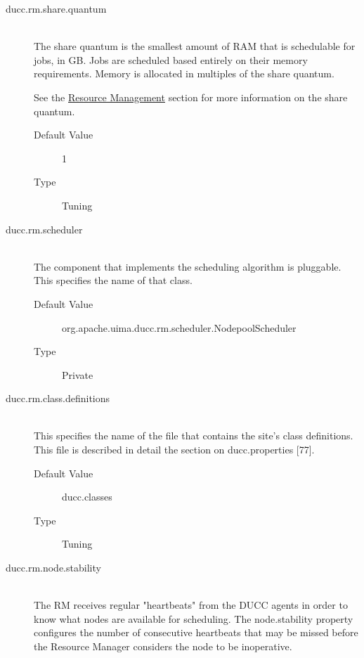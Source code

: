 \begin{description}
        \item[ducc.rm.share.quantum] \hfill \\
          The share quantum is the smallest amount of RAM that is schedulable for jobs, in GB. 
          Jobs are scheduled based entirely on their memory requirements. Memory is allocated in 
          multiples of the share quantum. 

          See the \hyperref[chap:rm]{Resource Management} section for more information on the share quantum.
          \begin{description}
            \item[Default Value] 1
            \item[Type] Tuning 
          \end{description}

        \item[ducc.rm.scheduler] \hfill \\
          The component that implements the scheduling algorithm is pluggable. This specifies the 
          name of that class. 
          \begin{description}
            \item[Default Value] org.apache.uima.ducc.rm.scheduler.NodepoolScheduler 
            \item[Type] Private
          \end{description} 
          
        \item[ducc.rm.class.definitions] \hfill \\
          This specifies the name of the file that contains the site's class definitions. This file is 
          described in detail the section on ducc.properties [77]. 
          \begin{description}
            \item[Default Value] ducc.classes 
            \item[Type] Tuning 
          \end{description}
          
        \item[ducc.rm.node.stability] \hfill \\
          The RM receives regular "heartbeats" from the DUCC agents in order to know what 
          nodes are available for scheduling. The node.stability property configures the number of 
          consecutive heartbeats that may be missed before the Resource Manager considers the 
          node to be inoperative. 


\end{description}
